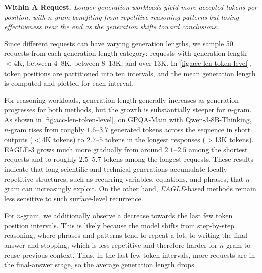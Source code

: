 \begin{quoting}[leftmargin=1.5em, rightmargin=1.5em, vskip=0pt]
\textbf{Within A Request.}
\emph{Longer generation workloads yield more accepted tokens per position, with $n$-gram benefiting from repetitive reasoning patterns but losing effectiveness near the end as the generation shifts toward conclusions.}

\end{quoting}

Since different requests can have varying generation lengths, we sample 50 requests from each generation-length category: requests with generation length $<$4K, between 4–8K, between 8–13K, and over 13K. 
In \autoref{fig:acc-len-token-level}, token positions are partitioned into ten intervals, and the mean generation length is computed and plotted for each interval.

For reasoning workloads, generation length generally increases as generation progresses for both methods, but the growth is substantially steeper for $n$-gram. As shown in \autoref{fig:acc-len-token-level}, on GPQA-Main with Qwen-3-8B-Thinking, $n$-gram rises from roughly $1.6$--$3.7$ generated tokens across the sequence in short outputs ($<$4K tokens) to $2.7$--$5$ tokens in the longest responses ($>$13K tokens). 
EAGLE-3 grows much more gradually from around $2.1$--$2.5$ among the shortest requests and to roughly $2.5$--$5.7$ tokens among the longest requests. 
These results indicate that long scientific and technical generations accumulate locally repetitive structures, such as recurring variables, equations, and phrases, that $n$-gram can increasingly exploit. On the other hand, \textit{EAGLE}-based methods remain less sensitive to such surface-level recurrence.

For $n$-gram, we additionally observe a decrease towards the last few token position intervals. This is likely because the model shifts from step-by-step reasoning, where phrases and patterns tend to repeat a lot, to writing the final answer and stopping, which is less repetitive and therefore harder for $n$-gram to reuse previous context. Thus, in the last few token intervals, more requests are in the final-answer stage, so the average generation length drops.




